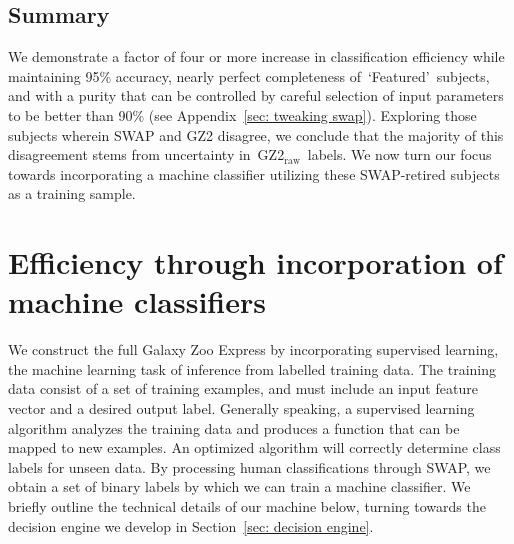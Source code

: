 \documentclass[twocolumn, trackchanges, linenumbers]{aastex6}%
\newcommand{\feat}{`Featured'}
\newcommand{\raw}{GZ2$_{\text{raw}}$}
\begin{document}
\subsection{Summary}

We demonstrate a factor of four or more increase in 
classification efficiency while maintaining 95\% accuracy, nearly perfect 
completeness of~\feat~subjects, and with a purity that can be controlled by careful 
selection of input parameters to be better than 90\% (see Appendix~\ref{sec: tweaking swap}).
Exploring those subjects wherein SWAP and GZ2 disagree, we conclude that 
the majority of this disagreement stems from uncertainty in~\raw~labels.
We now turn our focus towards incorporating a machine
classifier utilizing these SWAP-retired subjects as a training sample. 


\section{Efficiency through incorporation of machine classifiers} \label{sec: machine}

We construct the full Galaxy Zoo Express by incorporating supervised 
learning, the machine learning task of inference from labelled training data. 
The training data consist of a set of training examples, and must include
an input feature vector and a desired output label.  Generally speaking,
a supervised learning algorithm analyzes the training data and produces a 
function that can be mapped to new examples. An optimized algorithm will 
correctly determine class labels for unseen data. By processing human classifications 
through SWAP, we obtain a set of binary labels by which we can train a machine 
classifier. We briefly outline the technical details of our machine below,  turning
towards the decision engine we develop in Section~\ref{sec: decision engine}. 



\end{document}
